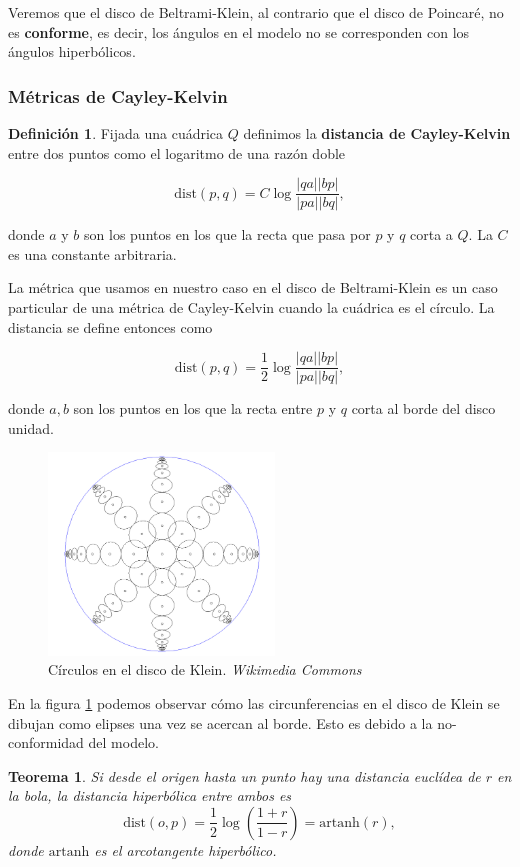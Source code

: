 \documentclass{article}
\theoremstyle{plain}
\newtheorem{theorem}{Teorema}
\theoremstyle{definition}
\newtheorem{definition}{Definición}
\theoremstyle{remark}
\begin{document}
Veremos que el disco de Beltrami-Klein, al contrario que el disco de
Poincaré, no es \textbf{conforme}, es decir, los ángulos en el modelo
no se corresponden con los ángulos hiperbólicos.

\subsubsection{Métricas de Cayley-Kelvin}
\begin{definition}
  Fijada una cuádrica $Q$ definimos la \textbf{distancia de Cayley-Kelvin}
  entre dos puntos como el logaritmo de una razón doble

  \[
    \mathrm{dist}(p,q) = C\log\frac{|qa||bp|}{|pa||bq|},
  \]

  donde $a$ y $b$ son los puntos en los que la recta que pasa por $p$
  y $q$ corta a $Q$. La $C$ es una constante arbitraria.
\end{definition}

La métrica que usamos en nuestro caso en el disco de Beltrami-Klein es
un caso particular de una métrica de Cayley-Kelvin cuando la cuádrica
es el círculo. La distancia se define entonces como

\[
  \mathrm{dist}(p,q) = \frac{1}{2}\log\frac{|qa||bp|}{|pa||bq|},
\]

donde $a,b$ son los puntos en los que la recta entre $p$ y $q$ corta
al borde del disco unidad.

\begin{figure}[ht!]
  \centering
  \includegraphics[width=60mm]{./kleinmodelcircles.png}
  \caption{Círculos en el disco de Klein. \textit{Wikimedia Commons}\label{kleincircles}}
\end{figure}

En la figura \ref{kleincircles} podemos observar cómo las circunferencias
en el disco de Klein se dibujan como elipses una vez se acercan al borde.
Esto es debido a la no-conformidad del modelo.

\begin{theorem}
  Si desde el origen hasta un punto hay una distancia euclídea de $r$
  en la bola, la distancia hiperbólica entre ambos es
  \[
    \mathrm{dist}(o,p) = \frac{1}{2} \log\left(\frac{1+r}{1-r}\right) = \mathrm{artanh}(r),
  \]
  donde $\mathrm{artanh}$ es el arcotangente hiperbólico.
\end{theorem}
\end{document}
